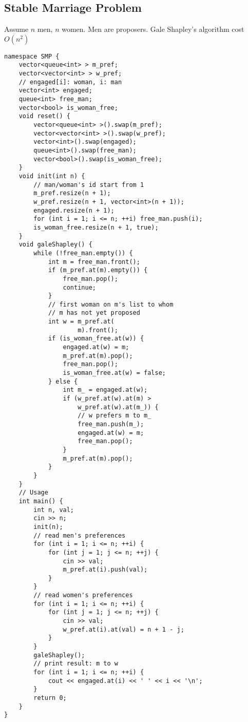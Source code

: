 \documentclass[10pt]{article}{\twocolumn}
\begin{document}
\subsection{Stable Marriage Problem}
Assume $n$ men, $n$ women. Men are proposers. Gale Shapley's algorithm cost $O(n^2)$
\begin{lstlisting}
namespace SMP {
    vector<queue<int> > m_pref;
    vector<vector<int> > w_pref;
    // engaged[i]: woman, i: man
    vector<int> engaged;
    queue<int> free_man;
    vector<bool> is_woman_free;
    void reset() {
        vector<queue<int> >().swap(m_pref);
        vector<vector<int> >().swap(w_pref);
        vector<int>().swap(engaged);
        queue<int>().swap(free_man);
        vector<bool>().swap(is_woman_free);
    }
    void init(int n) {
        // man/woman's id start from 1
        m_pref.resize(n + 1);
        w_pref.resize(n + 1, vector<int>(n + 1));
        engaged.resize(n + 1);
        for (int i = 1; i <= n; ++i) free_man.push(i);
        is_woman_free.resize(n + 1, true);
    }
    void galeShapley() {
        while (!free_man.empty()) {
            int m = free_man.front();
            if (m_pref.at(m).empty()) {
                free_man.pop();
                continue;
            }
            // first woman on m's list to whom 
            // m has not yet proposed
            int w = m_pref.at(
                    m).front();
            if (is_woman_free.at(w)) {
                engaged.at(w) = m;
                m_pref.at(m).pop();
                free_man.pop();
                is_woman_free.at(w) = false;
            } else {
                int m_ = engaged.at(w);
                if (w_pref.at(w).at(m) >
                    w_pref.at(w).at(m_)) {
                    // w prefers m to m_
                    free_man.push(m_);
                    engaged.at(w) = m;
                    free_man.pop();
                }
                m_pref.at(m).pop();
            }
        }
    }
    // Usage
    int main() {
        int n, val;
        cin >> n;
        init(n);
        // read men's preferences
        for (int i = 1; i <= n; ++i) {
            for (int j = 1; j <= n; ++j) {
                cin >> val;
                m_pref.at(i).push(val);
            }
        }
        // read women's preferences
        for (int i = 1; i <= n; ++i) {
            for (int j = 1; j <= n; ++j) {
                cin >> val;
                w_pref.at(i).at(val) = n + 1 - j;
            }
        }
        galeShapley();
        // print result: m to w
        for (int i = 1; i <= n; ++i) {
            cout << engaged.at(i) << ' ' << i << '\n';
        }
        return 0;
    }
}
\end{lstlisting}
\end{document}
